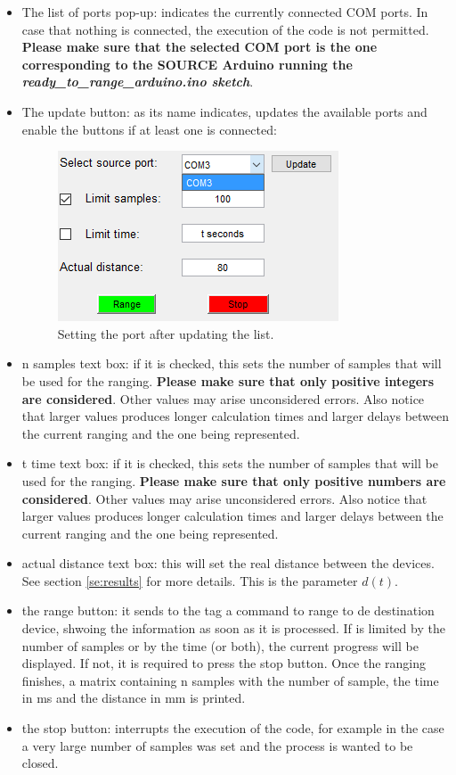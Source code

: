 \documentclass[a4paper, 21pt]{article} %
\begin{document}
\begin{itemize}
\item The list of ports pop-up: indicates the currently connected COM ports. In case that nothing is connected, the execution of the code is not permitted. \textbf{Please make sure that the selected COM port is the one corresponding to the SOURCE Arduino running the \textit{ready\_to\_range\_arduino.ino sketch}}.
\item The update button: as its name indicates, updates the available ports and enable the buttons if at least one is connected:
\begin{figure}[H]
\begin{center}
\includegraphics[scale=.8]{fig/ss_control2.png}
\end{center}
\caption{Setting the port after updating the list.}
\end{figure}
\item n samples text box: if it is checked, this sets the number of samples that will be used for the ranging. \textbf{Please make sure that only positive integers are considered}. Other values may arise unconsidered errors. Also notice that larger values produces longer calculation times and larger delays between the current ranging and the one being represented.
\item t time text box: if it is checked, this sets the number of samples that will be used for the ranging. \textbf{Please make sure that only positive numbers are considered}. Other values may arise unconsidered errors. Also notice that larger values produces longer calculation times and larger delays between the current ranging and the one being represented.
\item actual distance text box: this will set the real distance between the devices. See section \ref{se:results} for more details. This is the parameter $d(t)$.
\item the range button: it sends to the tag a command to range to de destination device, shwoing the information as soon as it is processed. If is limited by the number of samples or by the time (or both), the current progress will be displayed. If not, it is required to press the stop button. Once the ranging finishes, a matrix containing n samples with the number of sample, the time in ms and the distance in mm is printed.
\item the stop button: interrupts the execution of the code, for example in the case a very large number of samples was set and the process is wanted to be closed.
\end{itemize}
\end{document}
